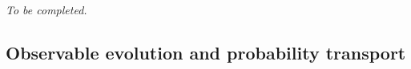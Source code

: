 \documentclass[12pt,a4paper,oneside]{book}
\begin{document}
\begin{example}
%
%

\noindent\textit{To be completed.}
\end{example}

\subsection{Observable evolution and probability transport}
\end{document}
